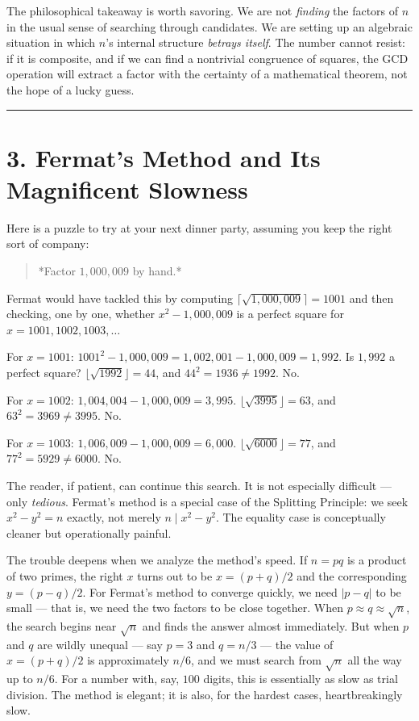 \documentclass[12pt, letterpaper, openany]{book}
\theoremstyle{definition}
\theoremstyle{remark}
\begin{document}
The philosophical takeaway is worth savoring. We are not \textit{finding} the factors of $n$ in the usual sense of searching through candidates. We are setting up an algebraic situation in which $n$'s internal structure \textit{betrays itself}. The number cannot resist: if it is composite, and if we can find a nontrivial congruence of squares, the GCD operation will extract a factor with the certainty of a mathematical theorem, not the hope of a lucky guess.


\bigskip\noindent\rule{\textwidth}{0.4pt}\bigskip



\section*{3. Fermat's Method and Its Magnificent Slowness}


Here is a puzzle to try at your next dinner party, assuming you keep the right sort of company:


\begin{quote}
*Factor $1{,}000{,}009$ by hand.*
\end{quote}


Fermat would have tackled this by computing $\lceil \sqrt{1{,}000{,}009} \rceil = 1001$ and then checking, one by one, whether $x^2 - 1{,}000{,}009$ is a perfect square for $x = 1001, 1002, 1003, \ldots$

For $x = 1001$: $1001^2 - 1{,}000{,}009 = 1{,}002{,}001 - 1{,}000{,}009 = 1{,}992$. Is $1{,}992$ a perfect square? $\lfloor \sqrt{1992} \rfloor = 44$, and $44^2 = 1936 \neq 1992$. No.

For $x = 1002$: $1{,}004{,}004 - 1{,}000{,}009 = 3{,}995$. $\lfloor \sqrt{3995} \rfloor = 63$, and $63^2 = 3969 \neq 3995$. No.

For $x = 1003$: $1{,}006{,}009 - 1{,}000{,}009 = 6{,}000$. $\lfloor \sqrt{6000} \rfloor = 77$, and $77^2 = 5929 \neq 6000$. No.

The reader, if patient, can continue this search. It is not especially difficult --- only \textit{tedious}. Fermat's method is a special case of the Splitting Principle: we seek $x^2 - y^2 = n$ exactly, not merely $n \mid x^2 - y^2$. The equality case is conceptually cleaner but operationally painful.

The trouble deepens when we analyze the method's speed. If $n = pq$ is a product of two primes, the right $x$ turns out to be $x = (p + q)/2$ and the corresponding $y = (p - q)/2$. For Fermat's method to converge quickly, we need $|p - q|$ to be small --- that is, we need the two factors to be close together. When $p \approx q \approx \sqrt{n}$, the search begins near $\sqrt{n}$ and finds the answer almost immediately. But when $p$ and $q$ are wildly unequal --- say $p = 3$ and $q = n/3$ --- the value of $x = (p + q)/2$ is approximately $n/6$, and we must search from $\sqrt{n}$ all the way up to $n/6$. For a number with, say, $100$ digits, this is essentially as slow as trial division. The method is elegant; it is also, for the hardest cases, heartbreakingly slow.
\end{document}
